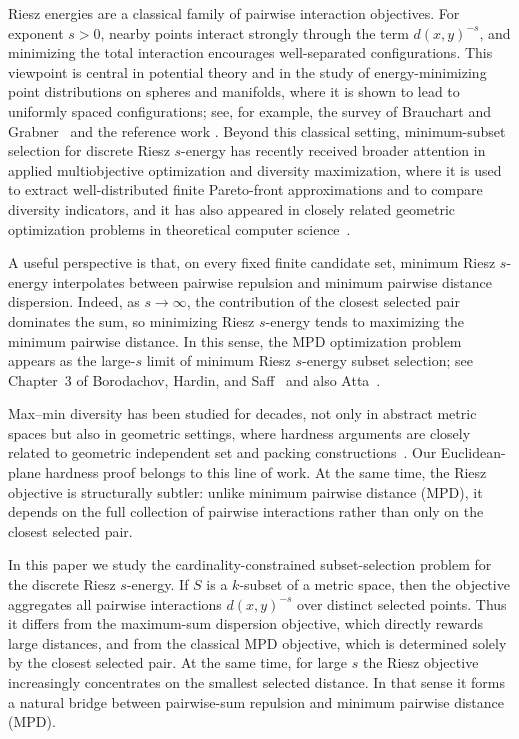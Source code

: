 \documentclass[11pt]{article}
\begin{document}
Riesz energies are a classical family of pairwise interaction objectives. For exponent $s>0$, nearby points interact strongly through the term $d(x,y)^{-s}$, and minimizing the total interaction encourages well-separated configurations. This viewpoint is central in potential theory and in the study of energy-minimizing point distributions on spheres and manifolds, where it is shown to lead to uniformly spaced configurations; see, for example, the survey of Brauchart and Grabner~\cite{BrauchartGrabner2015} and the reference work \cite{BorodachovHardinSaff2019}. Beyond this classical setting, minimum-subset selection for discrete Riesz $s$-energy has recently received broader attention in applied multiobjective optimization and diversity maximization, where it is used to extract well-distributed finite Pareto-front approximations and to compare diversity indicators, and it has also appeared in closely related geometric optimization problems in theoretical computer science~\cite{Atta2026,FalconCardonaUribeRosas2024,PereverdievaEtAl2025}. 

A useful perspective is that, on every fixed finite candidate set, minimum
Riesz $s$-energy interpolates between pairwise repulsion and minimum pairwise distance
dispersion. Indeed, as $s\to\infty$, the contribution of the closest selected
pair dominates the sum, so minimizing Riesz $s$-energy tends to maximizing the
minimum pairwise distance. In this sense, the MPD optimization problem
appears as the large-$s$ limit of minimum Riesz $s$-energy subset selection;
see Chapter~3 of Borodachov, Hardin, and
Saff~\cite{BorodachovHardinSaff2019} and also Atta~\cite{Atta2026}.

Max--min diversity has been studied for decades, not only in abstract metric
spaces but also in geometric settings, where hardness arguments are closely
related to geometric independent set and packing constructions~\cite{ghosh1996computational,RaviRosenkrantzTayi1994,FowlerPatersonTanimoto1981}. Our Euclidean-plane hardness proof belongs to this line of work. At the same time, the Riesz objective is structurally subtler: unlike minimum pairwise distance (MPD), it depends on the full collection of pairwise interactions rather than only on the closest selected pair.

In this paper we study the cardinality-constrained subset-selection problem for the discrete Riesz $s$-energy. If $S$ is a $k$-subset of a metric space, then the objective aggregates all pairwise interactions $d(x,y)^{-s}$ over distinct selected points. Thus it differs from the maximum-sum dispersion objective, which directly rewards large distances, and from the classical MPD objective, which is determined solely by the closest selected pair. At the same time, for large $s$ the Riesz objective increasingly concentrates on the smallest selected distance. In that sense it forms a natural bridge between pairwise-sum repulsion and minimum pairwise distance (MPD).
\end{document}
